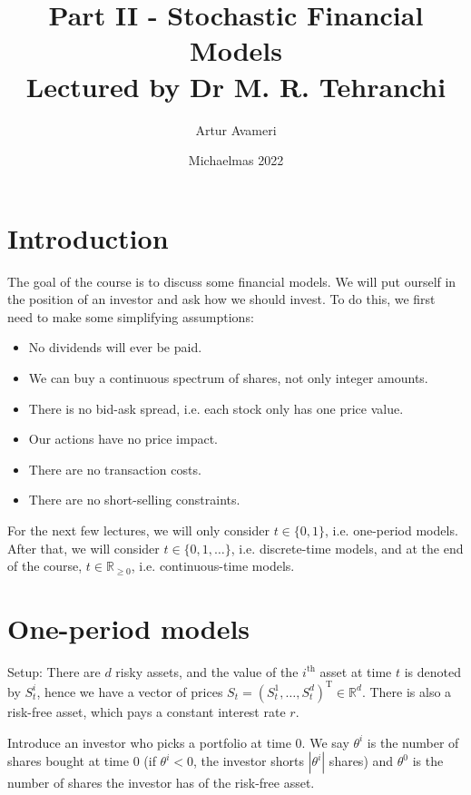 \documentclass{article}
\title{Part II - Stochastic Financial Models
    \\ \large
    Lectured by Dr M. R. Tehranchi
}
\author{Artur Avameri}
\date{Michaelmas 2022}
\theoremstyle{definition}
\begin{document}
\maketitle
\tableofcontents
\newpage

\section{Introduction}


The goal of the course is to discuss some financial models. We will put ourself in the position of an investor and ask how we should invest. To do this, we first need to make some simplifying assumptions:
\begin{itemize}
    \item No dividends will ever be paid.
    \item We can buy a continuous spectrum of shares, not only integer amounts.
    \item There is no bid-ask spread, i.e. each stock only has one price value.
    \item Our actions have no price impact.
    \item There are no transaction costs.
    \item There are no short-selling constraints.
\end{itemize}

For the next few lectures, we will only consider $t \in \{0,1\}$, i.e. one-period models. After that, we will consider $t \in \{0,1,\ldots\}$, i.e. discrete-time models, and at the end of the course, $t \in \mathbb{R}_{\ge 0}$, i.e. continuous-time models.

\section{One-period models}

Setup: There are $d$ risky assets, and the value of the $i^{\text{th}}$ asset at time $t$ is denoted by $S^i_t$, hence we have a vector of prices $S_t = (S^1_t, \ldots, S^d_t)^{\text{T}} \in \mathbb{R}^d$. There is also a risk-free asset, which pays a constant interest rate $r$. 

\vspace{1mm}

Introduce an investor who picks a portfolio at time 0. We say $\theta^i$ is the number of shares bought at time 0 (if $\theta^i<0$, the investor shorts $|\theta^i|$ shares) and $\theta^0$ is the number of shares the investor has of the risk-free asset.
\end{document}
